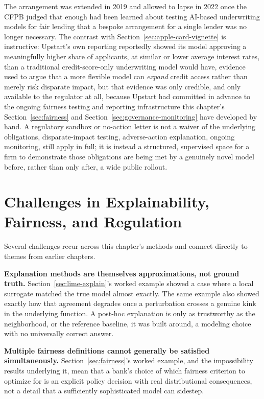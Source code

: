\documentclass[../ai_in_finance]{subfiles}
\begin{document}
The arrangement was extended in 2019 and allowed to lapse in 2022 once the CFPB judged that enough had been learned about testing AI-based underwriting models for fair lending that a bespoke arrangement for a single lender was no longer necessary. The contrast with Section~\ref{sec:apple-card-vignette} is instructive: Upstart's own reporting reportedly showed its model approving a meaningfully higher share of applicants, at similar or lower average interest rates, than a traditional credit-score-only underwriting model would have, evidence used to argue that a more flexible model can \emph{expand} credit access rather than merely risk disparate impact, but that evidence was only credible, and only available to the regulator at all, because Upstart had committed in advance to the ongoing fairness testing and reporting infrastructure this chapter's Section~\ref{sec:fairness} and Section~\ref{sec:governance-monitoring} have developed by hand. A regulatory sandbox or no-action letter is not a waiver of the underlying obligations, disparate-impact testing, adverse-action explanation, ongoing monitoring, still apply in full; it is instead a structured, supervised space for a firm to demonstrate those obligations are being met by a genuinely novel model before, rather than only after, a wide public rollout.

\section{Challenges in Explainability, Fairness, and Regulation}

Several challenges recur across this chapter's methods and connect directly to themes from earlier chapters.

\textbf{Explanation methods are themselves approximations, not ground truth.} Section~\ref{sec:lime-explain}'s worked example showed a case where a local surrogate matched the true model almost exactly. The same example also showed exactly how that agreement degrades once a perturbation crosses a genuine kink in the underlying function. A post-hoc explanation is only as trustworthy as the neighborhood, or the reference baseline, it was built around, a modeling choice with no universally correct answer.

\textbf{Multiple fairness definitions cannot generally be satisfied simultaneously.} Section~\ref{sec:fairness}'s worked example, and the impossibility results underlying it, mean that a bank's choice of which fairness criterion to optimize for is an explicit policy decision with real distributional consequences, not a detail that a sufficiently sophisticated model can sidestep.
\end{document}
